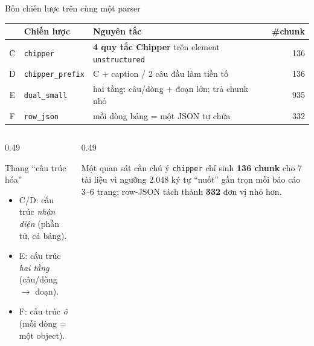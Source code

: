 \documentclass[aspectratio=169,11pt]{beamer}
\begin{document}
\begin{frame}{Bốn chiến lược trên cùng một parser}
  \centering\footnotesize
  \begin{tabular}{@{}cl p{} r@{}}
    \toprule
    & \textbf{Chiến lược} & \textbf{Nguyên tắc} & \textbf{\#chunk} \\
    \midrule
    C & \texttt{chipper} & \textbf{4 quy tắc Chipper} trên element \texttt{unstructured} & 136 \\
    D & \texttt{chipper\_prefix} & C + caption / 2 câu đầu làm tiền tố & 136 \\
    E & \texttt{dual\_small} & hai tầng: câu/dòng + đoạn lớn; trả chunk nhỏ & 935 \\
    F & \texttt{row\_json} & mỗi dòng bảng = một JSON tự chứa & 332 \\
    \bottomrule
  \end{tabular}
  \vspace{0.5em}
  \begin{columns}[T]
    \begin{column}{0.49\textwidth}
      \begin{block}{\small Thang ``cấu trúc hóa''}
        \begin{itemize}\small
          \item C/D: cấu trúc \emph{nhận diện} (phần tử, cả bảng).
          \item E: cấu trúc \emph{hai tầng} (câu/dòng $\rightarrow$ đoạn).
          \item F: cấu trúc \emph{ô} (mỗi dòng = một object).
        \end{itemize}
      \end{block}
    \end{column}
    \begin{column}{0.49\textwidth}
      \begin{alertblock}{\small Một quan sát cần chú ý}
        \texttt{chipper} chỉ sinh \textbf{136 chunk} cho 7 tài liệu vì ngưỡng
        2.048 ký tự ``nuốt'' gần trọn mỗi báo cáo 3--6 trang; row-JSON tách
        thành \textbf{332} đơn vị nhỏ hơn.
      \end{alertblock}
    \end{column}
  \end{columns}
\end{frame}
\end{document}

